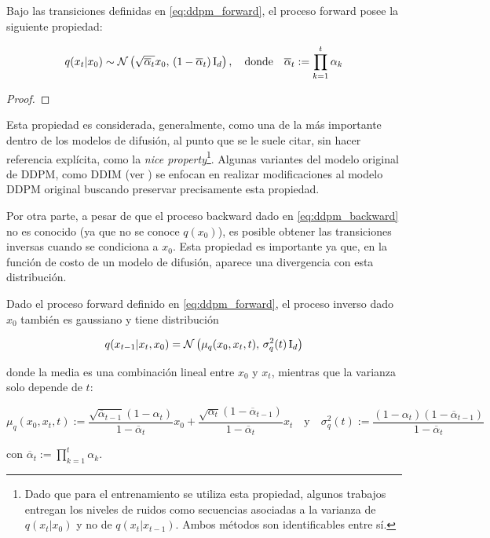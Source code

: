 \begin{prop}
    \label{prop:forward_marginal}
    Bajo las transiciones definidas en \eqref{eq:ddpm_forward}, el proceso forward posee la siguiente propiedad:

    \begin{equation}
        \label{eq:forward_marginal}
        q(x_t|x_0)\sim\mathcal{N}\left(\sqrt{\overline{\alpha}_t}x_0,\,(1-\overline{\alpha}_t)\operatorname{I}_{d}\right),
        \quad\text{donde}\quad
        \overline{\alpha}_t := \prod\limits_{k=1}^t \alpha_k
    \end{equation}
\end{prop}

\begin{proof}
\end{proof}

Esta propiedad es considerada, generalmente, como una de la más importante dentro de los modelos de difusión, al punto que se le suele citar, sin hacer referencia explícita, como la \textit{nice property}\footnote{Dado que para el entrenamiento se utiliza esta propiedad, algunos trabajos entregan los niveles de ruidos como secuencias asociadas a la varianza de $q(x_t|x_0)$ y no de $q(x_{t}|x_{t-1})$. Ambos métodos son identificables entre sí.}. Algunas variantes del modelo original de DDPM, como DDIM (ver \cite{song2022denoising}) se enfocan en realizar modificaciones al modelo DDPM original buscando preservar precisamente esta propiedad.

Por otra parte, a pesar de que el proceso backward dado en \eqref{eq:ddpm_backward} no es conocido (ya que no se conoce $q(x_0)$), es posible obtener las transiciones inversas cuando se condiciona a $x_0$. Esta propiedad es importante ya que, en la función de costo de un modelo de difusión, aparece una divergencia con esta distribución.

\begin{prop}
    \label{prop:conditional_backward}
    Dado el proceso forward definido en \eqref{eq:ddpm_forward}, el proceso inverso dado $x_0$ también es gaussiano y tiene distribución

    \begin{equation}
        \label{eq:conditional_backward}
        q(x_{t-1}|x_t,x_0) = \mathcal{N}\left(\mu_q(x_0,x_t,t),\,\sigma_q^2(t)\operatorname{I}_{d}\right)
    \end{equation}

    donde la media es una combinación lineal entre $x_0$ y $x_t$, mientras que la varianza solo depende de $t$:

    \begin{equation}
        \label{eq:conditional_backward_params}
        \mu_q(x_0,x_t, t) := \frac{\sqrt{\overline{\alpha}_{t-1}}(1-\alpha_t)}{1-\overline{\alpha}_t}x_0 + \frac{\sqrt{\alpha_t}(1-\overline{\alpha}_{t-1})}{1-\overline{\alpha}_t}x_t
        \quad\text{y}\quad
        \sigma_q^2(t) := \frac{(1-\alpha_t)(1-\overline{\alpha}_{t-1})}{1-\overline{\alpha}_t}
    \end{equation}

    con $\overline{\alpha}_t := \prod\limits_{k=1}^t \alpha_k$.
\end{prop}

